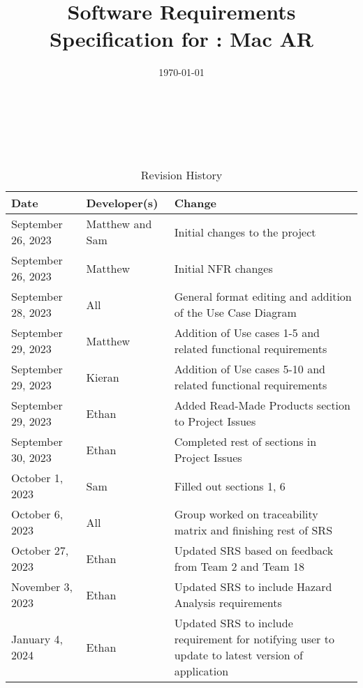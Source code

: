\documentclass[12pt]{article}
\begin{document}
\title{Software Requirements Specification for \progname: Mac AR}
\author{\authname}
\date{\today}

\maketitle

~\newpage


\tableofcontents

~\newpage

\begin{table}[hp]
	\caption{Revision History} \label{TblRevisionHistory}
	\begin{tabularx}{\textwidth}{llX}
		\toprule
		\textbf{Date}      & \textbf{Developer(s)} & \textbf{Change}                                                                    \\
		\midrule
		September 26, 2023 & Matthew and Sam               & Initial changes to the project                                                             \\
            September 26, 2023 & Matthew & Initial NFR changes \\
            September 28, 2023 & All & General format editing and addition of the Use Case Diagram\\
            September 29, 2023 & Matthew & Addition of Use cases 1-5 and related functional requirements\\
            September 29, 2023 & Kieran & Addition of Use cases 5-10 and related functional requirements\\
            September 29, 2023 & Ethan & Added Read-Made Products section to Project Issues\\
            September 30, 2023 & Ethan & Completed rest of sections in Project Issues\\
            October 1, 2023 & Sam & Filled out sections 1, 6\\
            October 6, 2023 & All & Group worked on traceability matrix and finishing rest of SRS\\  
            October 27, 2023 & Ethan & Updated SRS based on feedback from Team 2 and Team 18\\
            November 3, 2023 & Ethan & Updated SRS to include Hazard Analysis requirements\\
            January 4, 2024 & Ethan & Updated SRS to include requirement for notifying user to update to latest version of application\\

\end{tabularx}
\end{table}
\end{document}
